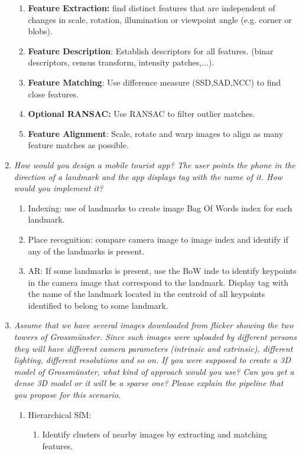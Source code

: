 \documentclass[a4paper,12 pt]{article}
\theoremstyle{definition}
\theoremstyle{remark}
\theoremstyle{definition}
\theoremstyle{definition}
\theoremstyle{definition}
\theoremstyle{definition}
\theoremstyle{remark}
\theoremstyle{remark}
\theoremstyle{definition}
\theoremstyle{definition}
\begin{document}
\begin{enumerate}
\begin{enumerate}
\item \textbf{Feature Extraction:} find distinct features that are independent of changes in scale, rotation, illumination or viewpoint angle (e.g. corner or blobs).
\item \textbf{Feature Description}: Establish descriptors for all features. (binar descriptors, census transform, intensity patches,...).
\item \textbf{Feature Matching}: Use difference measure (SSD,SAD,NCC) to find close features.
\item \textbf{Optional RANSAC:} Use RANSAC to filter outlier matches.
\item \textbf{Feature Alignment}: Scale, rotate and warp images to align as many feature matches as possible.  
\end{enumerate}
\item \textit{How would you design a mobile tourist app? The user points the phone in the direction of a landmark and the app displays tag with the name of it. How would you implement it?}
\begin{enumerate}
\item Indexing: use of landmarks to create image Bag Of Words index for each landmark.
\item Place recognition: compare camera image to image index and identify if any of the landmarks is present.
\item AR: If some landmarks is present, use the BoW inde to identify keypoints in the camera image that correspond to the landmark. Display tag with the name of the landmark located in the centroid of all keypoints identified to belong to some landmark.
\end{enumerate}
\item \textit{Assume that we have several images downloaded from flicker showing the two towers of Grossmünster. Since such images were uploaded by different persons they will have different camera parameters (intrinsic and extrinsic), different lighting, different resolutions and so on. If you were supposed to create a 3D model of Grossmünster, what kind of approach would you use? Can you get a dense 3D model or it will be a sparse one? Please explain the pipeline that you propose for this scenario.}
\begin{enumerate}
\item Hierarchical SfM:
\begin{enumerate}
\item Identify clusters of nearby images by extracting and matching features.

\end{enumerate}
\end{enumerate}
\end{enumerate}
\end{document}
